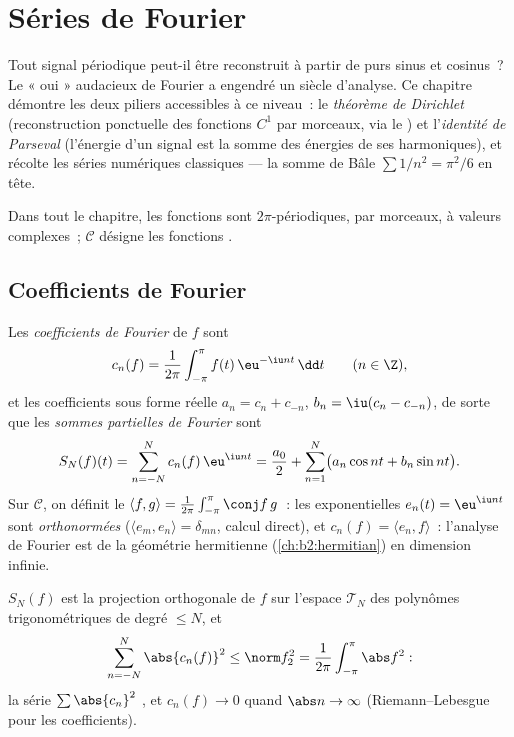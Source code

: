 \chapter{Séries de Fourier}\label{ch:b2:fourier}

Tout signal périodique peut-il être reconstruit à partir de purs
sinus et cosinus~? Le « oui » audacieux de Fourier a engendré un
siècle d'analyse. Ce chapitre démontre les deux piliers accessibles
à ce niveau~: le \emph{théorème de Dirichlet} (reconstruction ponctuelle
des fonctions $C^1$ par morceaux, via le ) et
l'\emph{identité de Parseval} (l'énergie d'un signal est la somme des
énergies de ses harmoniques), et récolte les séries numériques
classiques --- la somme de Bâle $\sum 1/n^2 = \pi^2/6$ en tête.

Dans tout le chapitre, les fonctions sont $2\pi$-périodiques,
 par morceaux, à valeurs complexes~; $\mathcal{C}$ désigne
les fonctions .

\section{Coefficients de Fourier}

\begin{definition}\label{def:b2:fourier:coefficients}
Les \emph{coefficients de Fourier} de
$f$ sont
\[
c_n(f) = \frac{1}{2\pi}\int_{-\pi}^{\pi} f(t)\,\eu^{-\iu n t}\,\dd
t \qquad (n \in \Z),
\]
et les coefficients sous forme réelle $a_n = c_n + c_{-n}$, $b_n =
\iu(c_n - c_{-n})$, de sorte que les \emph{sommes partielles de
Fourier} sont
\[
S_N(f)(t) = \sum_{n=-N}^{N} c_n(f)\,\eu^{\iu nt}
= \frac{a_0}{2} + \sum_{n=1}^{N}\bigl(a_n\cos nt + b_n \sin
nt\bigr).
\]
Sur $\mathcal{C}$, on définit le  $\langle
f, g\rangle = \frac{1}{2\pi}\int_{-\pi}^{\pi}\conj f\,g$~: les
exponentielles $e_n(t) = \eu^{\iu nt}$ sont \emph{orthonormées}
($\langle e_m, e_n\rangle = \delta_{mn}$, calcul direct), et
$c_n(f) = \langle e_n, f\rangle$~: l'analyse de Fourier est de la
géométrie hermitienne (\cref{ch:b2:hermitian}) en dimension infinie.
\end{definition}

\begin{proposition}\label{prop:b2:fourier:bessel}
$S_N(f)$ est la projection orthogonale de $f$ sur l'espace
$\mathcal{T}_N$ des polynômes trigonométriques de degré $\leq N$,
et
\[
\sum_{n=-N}^{N} \abs{c_n(f)}^2 \leq \norm f_2^2 =
\frac{1}{2\pi}\int_{-\pi}^{\pi} \abs f^2 :
\]
la série $\sum \abs{c_n}^2$ , et $c_n(f) \to 0$ quand
$\abs n \to \infty$ (Riemann--Lebesgue pour les coefficients).
\end{proposition}

